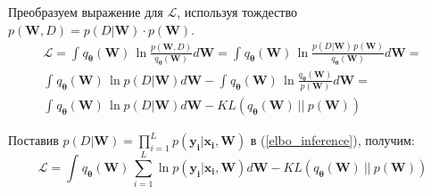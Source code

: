 \documentclass{article}
\numberwithin{equation}{section}
\begin{document}
    Преобразуем выражение для $\mathcal{L}$, используя тождество $p(\pmb{W}, D) = p(D | \pmb{W}) \cdot p(\pmb{W})$.
    \begin{equation}\label{elbo_inference}
    \begin{split}
        \mathcal{L}
        =
            \int_{}{
                q_{\pmb{\theta}}(\pmb{W})
                \,
                \ln{
                    \frac
                        {p(\pmb{W}, D)}
                        {q_{\pmb{\theta}}(\pmb{W})}
                }
                d\pmb{W}
            }
        =
            \int_{}{
                q_{\pmb{\theta}}(\pmb{W})
                \,
                \ln{
                    \frac
                        {
                            p(D | \pmb{W})
                            \,
                            p(\pmb{W})
                        }
                        {q_{\pmb{\theta}}(\pmb{W})}
                }
                d\pmb{W}
            }
        = \\
            \int_{}{
                q_{\pmb{\theta}}(\pmb{W})
                \,
                \ln{
                    p(D | \pmb{W})
                }
                d\pmb{W}
            }
            -
            \int_{}{
                q_{\pmb{\theta}}(\pmb{W})
                \,
                \ln{
                    \frac
                        {q_{\pmb{\theta}}(\pmb{W})}
                        {p(\pmb{W})}
                }
                d\pmb{W}
            }
        = \\
            \int_{}{
                q_{\pmb{\theta}}(\pmb{W})
                \,
                \ln{
                    p(D | \pmb{W})
                }
                d\pmb{W}
            }
            -
            KL(
                q_{\pmb{\theta}}(\pmb{W})~||~p(\pmb{W})
            )
    \end{split}
    \end{equation}

    Поставив
    $
        p(D | \pmb{W})
        =
        \prod_{i=1}^{L}{
            p(\pmb{y_i} | \pmb{x_i}, \pmb{W})
        }
    $
    в (\ref{elbo_inference}), получим:
    \begin{equation}
        \mathcal{L}
        =
            \int_{}{
                q_{\pmb{\theta}}(\pmb{W})
                \,
                \sum_{i=1}^{L}{
                    \ln{
                        p(\pmb{y_{i}} | \pmb{x_{i}}, \pmb{W})
                    }
                }
                d\pmb{W}
            }
            -
            KL(
                q_{\pmb{\theta}}(\pmb{W})~||~p(\pmb{W})
            )
    \end{equation}
\end{document}
